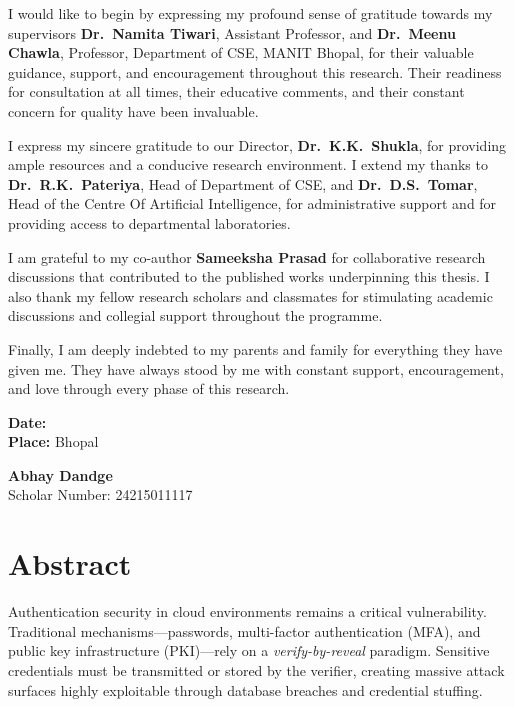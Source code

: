 \documentclass[12pt,a4paper,oneside]{report}
\begin{document}
I would like to begin by expressing my profound sense of gratitude towards my
supervisors \textbf{Dr.~Namita Tiwari}, Assistant Professor, and
\textbf{Dr.~Meenu Chawla}, Professor, Department of CSE, MANIT Bhopal, for
their valuable guidance, support, and encouragement throughout this research.
Their readiness for consultation at all times, their educative comments, and
their constant concern for quality have been invaluable.

I express my sincere gratitude to our Director, \textbf{Dr.~K.K.~Shukla}, for
providing ample resources and a conducive research environment. I extend my
thanks to \textbf{Dr.~R.K.~Pateriya}, Head of Department of CSE, and
\textbf{Dr.~D.S.~Tomar}, Head of the Centre Of Artificial Intelligence, for
administrative support and for providing access to departmental laboratories.

I am grateful to my co-author \textbf{Sameeksha Prasad} for collaborative
research discussions that contributed to the published works underpinning this
thesis. I also thank my fellow research scholars and classmates for stimulating
academic discussions and collegial support throughout the programme.

Finally, I am deeply indebted to my parents and family for everything they have
given me. They have always stood by me with constant support, encouragement, and
love through every phase of this research.

\vspace{2.5cm}
\noindent
\begin{minipage}[t]{0.45\textwidth}
\textbf{Date:}\\[0.4cm]
\textbf{Place:} Bhopal
\end{minipage}
\hfill
\begin{minipage}[t]{0.45\textwidth}
\raggedleft
\textbf{Abhay Dandge}\\
Scholar Number: 24215011117
\end{minipage}

\clearpage
\chapter*{Abstract}

Authentication security in cloud environments remains a critical vulnerability. Traditional mechanisms---passwords, multi-factor authentication (MFA), and public key infrastructure (PKI)---rely on a \textit{verify-by-reveal} paradigm. Sensitive credentials must be transmitted or stored by the verifier, creating massive attack surfaces highly exploitable through database breaches and credential stuffing.
\end{document}
